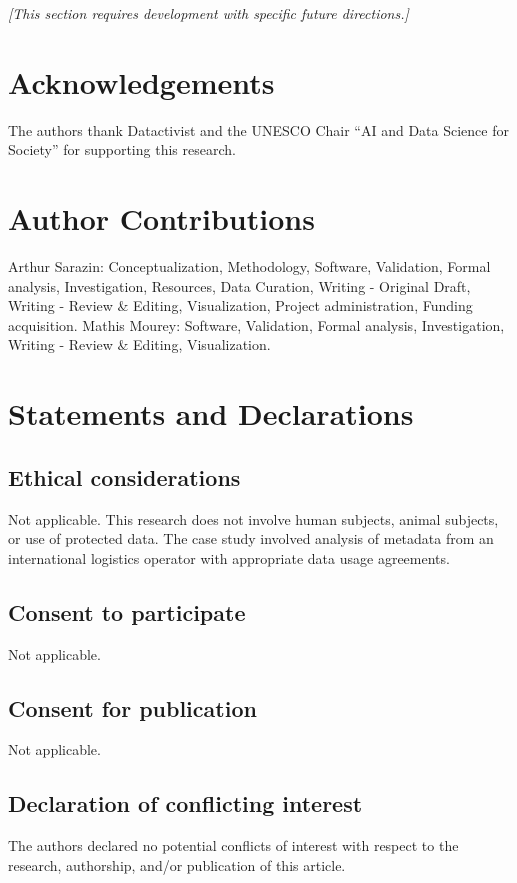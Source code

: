 \documentclass[Afour,times,sageh]{sagej}
\begin{document}
\textit{[This section requires development with specific future directions.]}

\section*{Acknowledgements}
The authors thank Datactivist and the UNESCO Chair ``AI and Data Science for Society'' for supporting this research.

\section*{Author Contributions}
Arthur Sarazin: Conceptualization, Methodology, Software, Validation, Formal analysis, Investigation, Resources, Data Curation, Writing - Original Draft, Writing - Review \& Editing, Visualization, Project administration, Funding acquisition. Mathis Mourey: Software, Validation, Formal analysis, Investigation, Writing - Review \& Editing, Visualization.

\section*{Statements and Declarations}

\subsection*{Ethical considerations}
Not applicable. This research does not involve human subjects, animal subjects, or use of protected data. The case study involved analysis of metadata from an international logistics operator with appropriate data usage agreements.

\subsection*{Consent to participate}
Not applicable.

\subsection*{Consent for publication}
Not applicable.

\subsection*{Declaration of conflicting interest}
The authors declared no potential conflicts of interest with respect to the research, authorship, and/or publication of this article.
\end{document}

